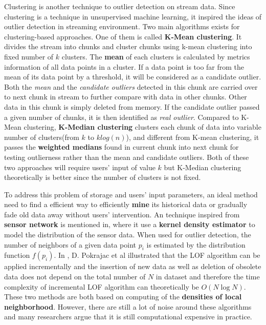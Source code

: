 \documentclass[11pt]{article}       %
\begin{document}
Clustering is another technique to outlier detection on stream data. Since clustering is a technique in unsupervised machine learning, it inspired the ideas of outlier detection in streaming environment. Two main algorithms exists for clustering-based approaches. One of them is called \textbf{K-Mean clustering}\cite{04666541}. It divides the stream into chunks and cluster chunks using k-mean clustering into fixed number of $k$ clusters. The \textbf{mean} of each clusters is calculated by metrics information of all data points in a cluster. If a data point is too far from the mean of its data point by a threshold, it will be considered as a candidate outlier. Both the \textit{mean} and the \textit{candidate outliers} detected in this chunk are carried over to next chunk in stream to further compare with data in other chunks. Other data in this chunk is simply deleted from memory. If the candidate outlier passed a given number of chunks, it is then identified as \textit{real outlier}. Compared to K-Mean clustering, \textbf{K-Median clustering}\cite{DBLP:journals/corr/abs-1002-4003} clusters each chunk of data into variable number of clusters(from $k$ to $k log(n)$), and different from K-mean clustering, it passes the \textbf{weighted medians} found in current chunk into next chunk for testing outlierness rather than the mean and candidate outliers. Both of these two approaches will require users' input of value $k$ but K-Median clustering theoretically is better since the number of clusters is not fixed. 

To address this problem of storage and users' input parameters, an ideal method need to find a efficient way to efficiently \textbf{mine} its historical data or gradually fade old data away without users' intervention. An technique inspired from \textbf{sensor network} is mentioned in\cite{Subramaniam:2006:OOD:1182635.1164145}, where it use a \textbf{kernel density estimator} to model the distribution of the sensor data. When used for outlier detection, the number of neighbors of a given data point $p_{i}$ is estimated by the distribution function $f(p_{i})$. In \cite{4221341}, D. Pokrajac et al illustrated that the LOF algorithm can be applied incrementally and the insertion of new data as well as deletion of obsolete data does not depend on the total number of $N$ in dataset and therefore the time complexity of incremental LOF algorithm can theoretically be $O(N\log{N})$. These two methods are both based on computing of the \textbf{densities of local neighborhood}. However, there are still a lot of noise around these algorithms and many researchers argue that it is still computational expensive in practice. 
\end{document}

